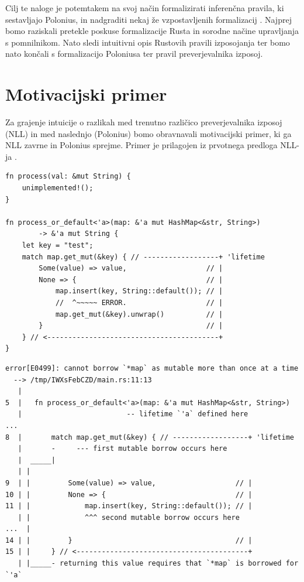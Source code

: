 \documentclass[a4paper,12pt,openright]{book}
\begin{document}
Cilj te naloge je potemtakem na svoj način formalizirati inferenčna pravila, ki sestavljajo Polonius, in nadgraditi nekaj že vzpostavljenih formalizacij \cite{stjernaModellingRustsReference}. Najprej bomo raziskali pretekle poskuse formalizacije Rusta in sorodne načine upravljanja s pomnilnikom. Nato sledi intuitivni opis Rustovih pravili izposojanja ter bomo nato končali s formalizacijo Poloniusa ter pravil preverjevalnika izposoj.

\section{Motivacijski primer}
\label{chap:motivacijski-primer}

Za grajenje intuicije o razlikah med trenutno različico preverjevalnika izposoj (NLL) in med naslednjo (Polonius) bomo obravnavali motivacijski primer, ki ga NLL zavrne in Polonius sprejme. Primer je prilagojen iz prvotnega predloga NLL-ja \cite{2094nllRustRFC}.

\begin{listing}[ht!]
	\begin{verbatim}
fn process(val: &mut String) {
    unimplemented!();
}

fn process_or_default<'a>(map: &'a mut HashMap<&str, String>) 
        -> &'a mut String {
    let key = "test";
    match map.get_mut(&key) { // ------------------+ 'lifetime
        Some(value) => value,                   // |
        None => {                               // |
            map.insert(key, String::default()); // |
            //  ^~~~~~ ERROR.                   // |
            map.get_mut(&key).unwrap()          // |
        }                                       // |
    } // <-----------------------------------------+
}
    \end{verbatim}
	\caption{Motivacijski primer za Polonius}
	\label{listing:mot_ex}
\end{listing}

\begin{listing}[ht!]
	\begin{verbatim}
error[E0499]: cannot borrow `*map` as mutable more than once at a time
  --> /tmp/IWXsFebCZD/main.rs:11:13
   |
5  |   fn process_or_default<'a>(map: &'a mut HashMap<&str, String>) 
   |                         -- lifetime `'a` defined here
...
8  |       match map.get_mut(&key) { // ------------------+ 'lifetime
   |       -     --- first mutable borrow occurs here
   |  _____|
   | |
9  | |         Some(value) => value,                   // |
10 | |         None => {                               // |
11 | |             map.insert(key, String::default()); // |
   | |             ^^^ second mutable borrow occurs here
...  |
14 | |         }                                       // |
15 | |     } // <-----------------------------------------+
   | |_____- returning this value requires that `*map` is borrowed for `'a`
    \end{verbatim}
	\caption{Napaka pri prevajanju primera \ref{listing:mot_ex}}
	\label{listing:mot_ex_err}
\end{listing}
\end{document}
